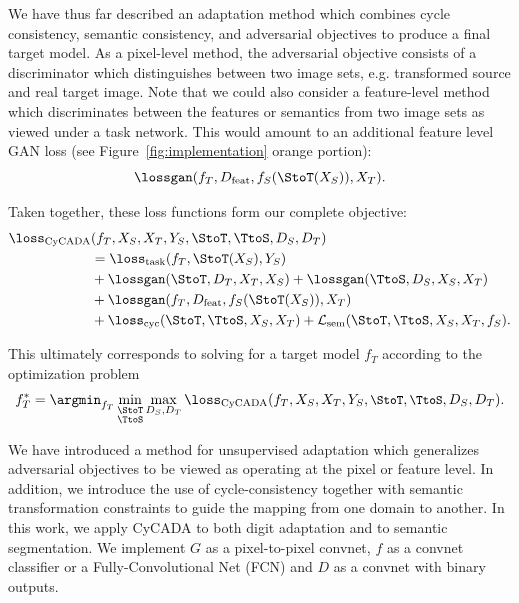 We have thus far described an adaptation method which combines cycle consistency, semantic consistency, and adversarial objectives to produce a final target model. As a pixel-level method, the adversarial objective consists of a discriminator which distinguishes between two image sets, e.g. transformed source and real target image. Note that we could also consider a feature-level method which discriminates between the features or semantics from two image sets as viewed under a task network. This would amount to an additional feature level GAN loss (see Figure~\ref{fig:implementation} orange portion):
\begin{equation}
	\lossgan(f_T, D_\text{feat}, f_S(\StoT(X_S)), X_T).\label{eq:adversarial-feature}
\end{equation}


Taken together, these loss functions form our complete objective:
\begin{align}
  \label{eq:cycada}
  \loss_{\text{CyCADA}}&(f_T, X_S, X_T, Y_S, \StoT, \TtoS, D_S, D_T) \\
  &= \loss_{\text{task}}(f_T, \StoT(X_S), Y_S) \nonumber \\
  &+ \lossgan(\StoT, D_T, X_T, X_S)
  + \lossgan(\TtoS, D_S, X_S, X_T) \nonumber \\
  &+ \lossgan(f_T, D_\text{feat}, f_S(\StoT(X_S)), X_T)\nonumber \\
  &+ \loss_\text{cyc}(\StoT, \TtoS, X_S, X_T)
  + \mathcal{L}_\text{sem}(\StoT, \TtoS, X_S, X_T, f_S). \nonumber
\end{align}

This ultimately corresponds to solving for a target model $f_T$ according to the optimization problem
\begin{equation}
   f_T^* = \argmin_{f_T} \min_{\substack{\StoT\\ \TtoS}} \max_{D_S, D_T} \loss_\text{CyCADA}(\small{f_T, X_S, X_T, Y_S, \StoT, \TtoS, D_S, D_T}).
\end{equation}

We have introduced a method for unsupervised adaptation which generalizes adversarial objectives to be viewed as operating at the pixel or feature level. In addition, we introduce the use of cycle-consistency together with semantic transformation constraints to guide the mapping from one domain to another. 
In this work, we apply CyCADA to both digit adaptation and to semantic segmentation. We implement $G$ as a pixel-to-pixel convnet, $f$ as a convnet classifier or a Fully-Convolutional Net (FCN) and $D$ as a convnet with binary outputs.
